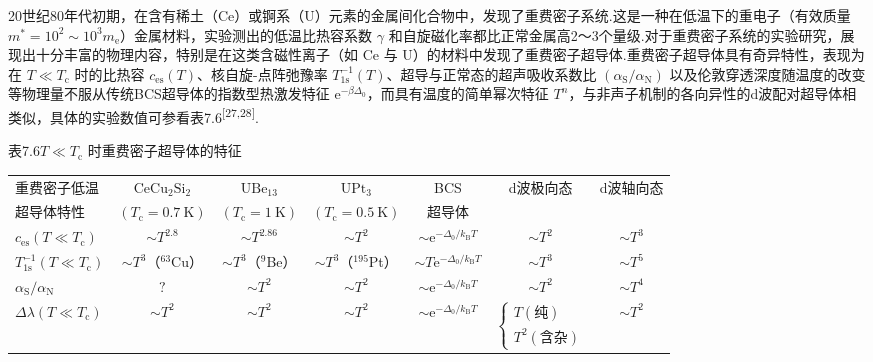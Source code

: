 20世纪80年代初期，在含有稀土（Ce）或锕系（U）元素的金属间化合物中，发现了重费密子系统.这是一种在低温下的重电子（有效质量 $m^{*}=10^{2}\sim10^{3}m_{\mathrm{e}}$）金属材料，实验测出的低温比热容系数 $\gamma$ 和自旋磁化率都比正常金属高2～3个量级.对于重费密子系统的实验研究，展现出十分丰富的物理内容，特别是在这类含磁性离子（如 Ce 与 U）的材料中发现了重费密子超导体.重费密子超导体具有奇异特性，表现为在 $T\ll T_{\mathrm{c}}$ 时的比热容 $c_{\mathrm{es}}(T)$、核自旋-点阵弛豫率 $T_{1\mathrm{s}}^{-1}(T)$、超导与正常态的超声吸收系数比 $\left(\alpha_{\mathrm{S}}/\alpha_{\mathrm{N}}\right)$ 以及伦敦穿透深度随温度的改变等物理量不服从传统BCS超导体的指数型热激发特征 $\mathrm{e}^{-\beta\Delta_{0}}$，而具有温度的简单幂次特征 $T^{n}$，与非声子机制的各向异性的d波配对超导体相类似，具体的实验数值可参看表7.6\textsuperscript{[27,28]}.

表7.6\quad $T\ll T_{\mathrm{c}}$ 时重费密子超导体的特征

\begin{center}\scriptsize
\begin{tabular}{lcccccc}
\hline
重费密子低温 & $\mathrm{CeCu}_{2}\mathrm{Si}_{2}$ & $\mathrm{UBe}_{13}$ & $\mathrm{UPt}_{3}$ & BCS & d波极向态 & d波轴向态\\
超导体特性 & $\left(T_{\mathrm{c}}=0.7\ \mathrm{K}\right)$ & $\left(T_{\mathrm{c}}=1\ \mathrm{K}\right)$ & $\left(T_{\mathrm{c}}=0.5\ \mathrm{K}\right)$ & 超导体 & & \\
\hline
$c_{\mathrm{es}}\left(T\ll T_{\mathrm{c}}\right)$ & $\sim T^{2.8}$ & $\sim T^{2.86}$ & $\sim T^{2}$ & $\sim\mathrm{e}^{-\Delta_{0}/k_{\mathrm{B}}T}$ & $\sim T^{2}$ & $\sim T^{3}$\\
$T_{1\mathrm{s}}^{-1}\left(T\ll T_{\mathrm{c}}\right)$ & $\sim T^{3}$（$^{63}$Cu） & $\sim T^{3}$（$^{9}$Be） & $\sim T^{3}$（$^{195}$Pt） & $\sim T\mathrm{e}^{-\Delta_{0}/k_{\mathrm{B}}T}$ & $\sim T^{3}$ & $\sim T^{5}$\\
$\alpha_{\mathrm{S}}/\alpha_{\mathrm{N}}$ & $?$ & $\sim T^{2}$ & $\sim T^{2}$ & $\sim\mathrm{e}^{-\Delta_{0}/k_{\mathrm{B}}T}$ & $\sim T^{2}$ & $\sim T^{4}$\\
$\Delta\lambda\left(T\ll T_{\mathrm{c}}\right)$ & $\sim T^{2}$ & $\sim T^{2}$ & $\sim T^{2}$ & $\sim\mathrm{e}^{-\Delta_{0}/k_{\mathrm{B}}T}$ &
$\begin{cases}T\left(\mbox{纯}\right)\\ T^{2}\left(\mbox{含杂}\right)\end{cases}$ & $\sim T^{2}$\\
\hline
\end{tabular}
\end{center}

